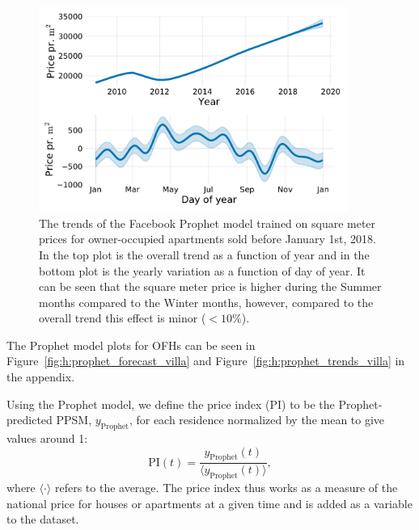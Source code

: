 \begin{figure}
  \includegraphics[draft, width=0.9\textwidth, trim=15 15 15 15, clip]{figures/housing/Ejerlejlighed_v18_cut_all_Ncols_all_prophet_trends.pdf}
  \caption[Prophet Trends]
          {The trends of the Facebook Prophet model trained on square meter prices for owner-occupied apartments sold before January 1st, 2018. In the top plot is the overall trend as a function of year and in the bottom plot is the yearly variation as a function of day of year. It can be seen that the square meter price is higher during the Summer months compared to the Winter months, however, compared to the overall trend this effect is minor ($<10\%$). 
          }
  \label{fig:h:prophet_trends}
\end{figure}

The Prophet model plots for OFHs can be seen in Figure~\ref{fig:h:prophet_forecast_villa} and Figure~\ref{fig:h:prophet_trends_villa} in the appendix. 

Using the Prophet model, we define the price index (PI) to be the Prophet-predicted PPSM, $y_\mathrm{Prophet}$, for each residence normalized by the mean to give values around \num{1}:
\begin{equation}
  \mathrm{PI}(t) = \frac{y_\mathrm{Prophet}(t)}{\langle y_\mathrm{Prophet}(t) \rangle},
\end{equation}
where $\langle \boldsymbol{\cdot} \rangle$ refers to the average. The price index thus works as a measure of the national price for houses or apartments at a given time and is added as a variable to the dataset. 


